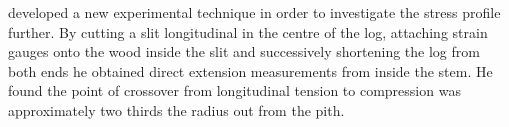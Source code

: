 \cite{boyd1950a} developed a new experimental technique in order to investigate the
stress profile further. By cutting a slit longitudinal in the centre of the
log, attaching strain gauges onto the wood inside the slit and successively
shortening the log from both ends he obtained direct extension measurements from
inside the stem. He found the point of crossover from longitudinal tension to compression was approximately two thirds the radius out from the pith. 